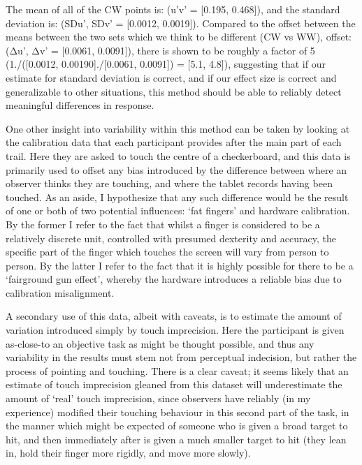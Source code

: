 
The mean of all of the CW points is: (u'v' = [0.195, 0.468]), and the standard deviation is: (SDu', SDv' = [0.0012, 0.0019]). Compared to the offset between the means between the two sets which we think to be different (CW vs WW), offset: (Δu', Δv' = [0.0061, 0.0091]), there is shown to be roughly a factor of 5 (1./([0.0012, 0.00190]./[0.0061, 0.0091]) = [5.1, 4.8]), suggesting that if our estimate for standard deviation is correct, and if our effect size is correct and generalizable to other situations, this method should be able to reliably detect meaningful differences in response.

One other insight into variability within this method can be taken by looking at the calibration data that each participant provides after the main part of each trail. Here they are asked to touch the centre of a checkerboard, and this data is primarily used to offset any bias introduced by the difference between where an observer thinks they are touching, and where the tablet records having been touched. As an aside, I hypothesize that any such difference would be the result of one or both of two potential influences: `fat fingers' and hardware calibration. By the former I refer to the fact that whilst a finger is considered to be a relatively discrete unit, controlled with presumed dexterity and accuracy, the specific part of the finger which touches the screen will vary from person to person. By the latter I refer to the fact that it is highly possible for there to be a `fairground gun effect', whereby the hardware introduces a reliable bias due to calibration misalignment.

A secondary use of this data, albeit with caveats, is to estimate the amount of variation introduced simply by touch imprecision. Here the participant is given as-close-to an objective task as might be thought possible, and thus any variability in the results must stem not from perceptual indecision, but rather the process of pointing and touching. There is a clear caveat; it seems likely that an estimate of touch imprecision gleaned from this dataset will underestimate the amount of `real' touch imprecision, since observers have reliably (in my experience) modified their touching behaviour in this second part of the task, in the manner which might be expected of someone who is given a broad target to hit, and then immediately after is given a much smaller target to hit (they lean in, hold their finger more rigidly, and move more slowly).

